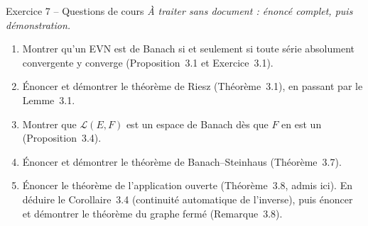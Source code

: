 \documentclass[11pt,a4paper]{article}
\newcommand{\Lc}{\mathcal{L}}
\theoremstyle{definition}
\begin{document}
\begin{exo}{Exercice 7 -- Questions de cours}
\emph{À traiter sans document : énoncé complet, puis démonstration.}
\begin{enumerate}[label=(\alph*)]
  \item Montrer qu'un EVN est de Banach si et seulement si toute série absolument convergente y converge (Proposition~3.1 et Exercice~3.1).
  \item Énoncer et démontrer le théorème de Riesz (Théorème~3.1), en passant par le Lemme~3.1.
  \item Montrer que $\Lc(E,F)$ est un espace de Banach dès que $F$ en est un (Proposition~3.4).
  \item Énoncer et démontrer le théorème de Banach--Steinhaus (Théorème~3.7).
  \item Énoncer le théorème de l'application ouverte (Théorème~3.8, admis ici). En déduire le Corollaire~3.4 (continuité automatique de l'inverse), puis énoncer et démontrer le théorème du graphe fermé (Remarque~3.8).
\end{enumerate}
\end{exo}
\end{document}
